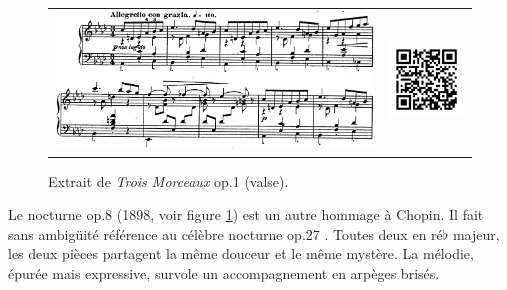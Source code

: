 \begin{figure}[!p]
  \begin{bigcenter}
    \begin{tabular}{lr}
      \includegraphics[width=12.5cm, keepaspectratio]{op1.png}
      &
      \includegraphics[width=3cm, keepaspectratio]{op1-qr.png}
    \end{tabular}
  \end{bigcenter}
  \caption{\label{op1}Extrait de \emph{Trois Morceaux} op.1  (valse).}
\end{figure}

Le nocturne op.8 (1898, voir figure \ref{op1}) est un autre hommage à Chopin. Il fait sans ambigüité référence au célèbre nocturne op.27 . Toutes deux en ré$\flat$ majeur, les deux pièces partagent la même douceur et le même mystère. La mélodie, épurée mais expressive, survole un accompagnement en arpèges brisés.


